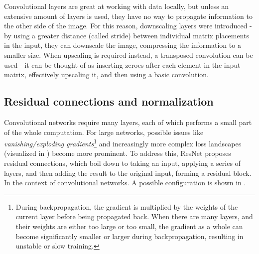 

Convolutional layers are great at working with data locally, but unless an extensive amount of layers is used, they have no way to propagate information to the other side of the image. For this reason, downscaling layers were introduced - by using a greater distance (called stride) between individual matrix placements in the input, they can downscale the image, compressing the information to a smaller size. When upscaling is required instead, a transposed convolution can be used - it can be thought of as inserting zeroes after each element in the input matrix, effectively upscaling it, and then using a basic convolution.



\subsection{Residual connections and normalization}

Convolutional networks require many layers, each of which performs a small part of the whole computation. For large networks, possible issues like \textit{vanishing/exploding gradients}\footnote{During backpropagation, the gradient is multiplied by the weights of the current layer before being propagated back. When there are many layers, and their weights are either too large or too small, the gradient as a whole can become significantly smaller or larger during backpropagation, resulting in unstable or slow training.} and increasingly more complex loss landscapes (visualized in \citep{loss_landscape}) become more prominent. To address this, ResNet \citep{resnet} proposes residual connections, which boil down to taking an input, applying a series of layers, and then adding the result to the original input, forming a residual block. In the context of convolutional networks. A possible configuration is shown in .



